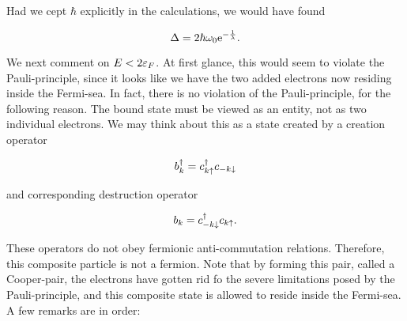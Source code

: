 Had we cept $\hbar$ explicitly in the calculations, we would have found 

\begin{equation}
\label{eq:cooper_delta}
\Delta = 2\hbar \omega_0 \mathrm{e}^{-\frac{1}{\lambda}}. 
\end{equation}

We next comment on $E < 2\varepsilon_F$. At first glance, this would seem to violate the Pauli-principle, since it looks like we have the two added electrons now residing inside the Fermi-sea. In fact, there is no violation of the Pauli-principle, for the following reason. The bound state must be viewed as an entity, not as two individual electrons. We may think about this as a state created by a creation operator 

\begin{equation}
b^{\dagger}_k = c^{\dagger}_{k \uparrow} c_{-k \downarrow}
\end{equation}

and corresponding destruction operator 

\begin{equation}
b_k = c^{\dagger}_{-k \downarrow} c_{k \uparrow}.
\end{equation}

These operators do not obey fermionic anti-commutation relations. Therefore, this composite particle is not a fermion. Note that by forming this pair, called a Cooper-pair, the electrons have gotten rid fo the severe limitations posed by the Pauli-principle, and this composite state is allowed to reside inside the Fermi-sea. A few remarks are in order: 

